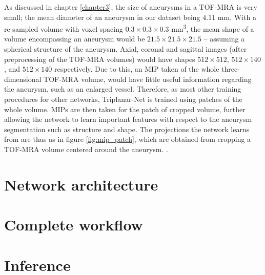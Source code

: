As discussed in chapter \ref{chapter3}, the size of aneurysms in a TOF-MRA is very small; the mean diameter of an aneurysm in our dataset being $4.11$ mm. With a re-sampled volume with voxel spacing $0.3 \times 0.3 \times 0.3$ mm\textsuperscript{3}, the mean shape of a volume encompassing an aneurysm would be $21.5 \times 21.5 \times 21.5$ -- assuming a spherical structure of the aneurysm. Axial, coronal and sagittal images (after preprocessing of the TOF-MRA volumes) would have shapes $512 \times 512$, $512 \times 140$, and $512 \times 140$ respectively. Due to this, an MIP taken of the whole three-dimensional TOF-MRA volume, would have little useful information regarding the aneurysm, such as an enlarged vessel. Therefore, as most other training procedures for other networks, Triplanar-Net is trained using patches of the whole volume. MIPs are then taken for the patch of cropped volume, further allowing the network to learn important features with respect to the aneurysm segmentation such as structure and shape. The projections the network learns from are thus as in figure \ref{fig:mip_patch}, which are obtained from cropping a TOF-MRA volume centered around the aneurysm.   .



\section{Network architecture}







\section{Complete workflow}

\section{Inference}


